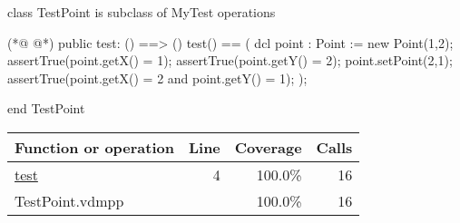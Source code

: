\begin{vdmpp}[breaklines=true]
class TestPoint is subclass of MyTest
operations

(*@
\label{test:4}
@*)
 public test: () ==> ()
 test() ==
 (
  dcl point : Point := new Point(1,2);
  assertTrue(point.getX() = 1);
  assertTrue(point.getY() = 2);
  point.setPoint(2,1);
  assertTrue(point.getX() = 2 and point.getY() = 1);
 );


end TestPoint
\end{vdmpp}
\bigskip
\begin{longtable}{|l|r|r|r|}
\hline
Function or operation & Line & Coverage & Calls \\
\hline
\hline
\hyperref[test:4]{test} & 4&100.0\% & 16 \\
\hline
\hline
TestPoint.vdmpp & & 100.0\% & 16 \\
\hline
\end{longtable}

